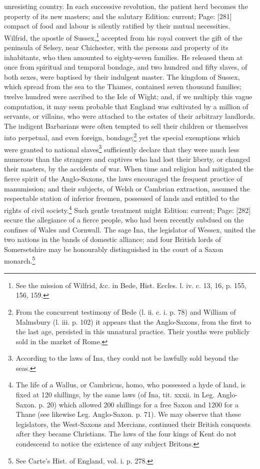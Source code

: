 unresisting country. In each successive revolution, the patient herd becomes the property of its new masters; and the salutary Edition: current; Page: [281] compact of food and labour is silently ratified by their mutual necessities. Wilfrid, the apostle of Sussex,\footnote{See the mission of Wilfrid, \&c. in Bede, Hist. Eccles. l. iv. c. 13, 16, p. 155, 156, 159.} accepted from his royal convert the gift of the peninsula of Selsey, near Chichester, with the persons and property of its inhabitants, who then amounted to eighty-seven families. He released them at once from spiritual and temporal bondage, and two hundred and fifty slaves, of both sexes, were baptised by their indulgent master. The kingdom of Sussex, which spread from the sea to the Thames, contained seven thousand families; twelve hundred were ascribed to the Isle of Wight; and, if we multiply this vague computation, it may seem probable that England was cultivated by a million of servants, or villains, who were attached to the estates of their arbitrary landlords. The indigent Barbarians were often tempted to sell their children or themselves into perpetual, and even foreign, bondage;\footnote{From the concurrent testimony of Bede (l. ii. c. i. p. 78) and William of Malmsbury (l. iii. p. 102) it appears that the Anglo-Saxons, from the first to the last age, persisted in this unnatural practice. Their youths were publicly sold in the market of Rome.} yet the special exemptions which were granted to national slaves\footnote{According to the laws of Ina, they could not be lawfully sold beyond the seas.} sufficiently declare that they were much less numerous than the strangers and captives who had lost their liberty, or changed their masters, by the accidents of war. When time and religion had mitigated the fierce spirit of the Anglo-Saxons, the laws encouraged the frequent practice of manumission; and their subjects, of Welsh or Cambrian extraction, assumed the respectable station of inferior freemen, possessed of lands and entitled to the rights of civil society.\footnote{The life of a Wallus, or Cambricus, homo, who possessed a hyde of land, is fixed at 120 shillings, by the same laws (of Ina, tit. xxxii. in Leg. Anglo-Saxon. p. 20) which allowed 200 shillings for a free Saxon and 1200 for a Thane (see likewise Leg. Anglo-Saxon. p. 71). We may observe that these legislators, the West-Saxons and Mercians, continued their British conquests after they became Christians. The laws of the four kings of Kent do not condescend to notice the existence of any subject Britons.} Such gentle treatment might Edition: current; Page: [282] secure the allegiance of a fierce people, who had been recently subdued on the confines of Wales and Cornwall. The sage Ina, the legislator of Wessex, united the two nations in the bands of domestic alliance; and four British lords of Somersetshire may be honourably distinguished in the court of a Saxon monarch.\footnote{See Carte\texthebrew{}’s Hist. of England, vol. i. p. 278.}

